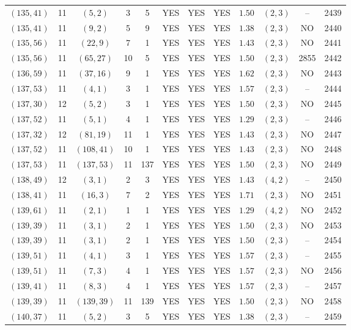 \begin{longtable}{|c|c|c|c|c|c|c|c|c|c|c|c|}
$(135,41)$ & 11 & $(5,2)$ & 3 & 5 & YES & YES & YES & $1.50$ & $(2,3)$ & -- & 2439\\
$(135,41)$ & 11 & $(9,2)$ & 5 & 9 & YES & YES & YES & $1.38$ & $(2,3)$ & NO & 2440\\
$(135,56)$ & 11 & $(22,9)$ & 7 & 1 & YES & YES & YES & $1.43$ & $(2,3)$ & NO & 2441\\
$(135,56)$ & 11 & $(65,27)$ & 10 & 5 & YES & YES & YES & $1.50$ & $(2,3)$ & 2855 & 2442\\
$(136,59)$ & 11 & $(37,16)$ & 9 & 1 & YES & YES & YES & $1.62$ & $(2,3)$ & NO & 2443\\
$(137,53)$ & 11 & $(4,1)$ & 3 & 1 & YES & YES & YES & $1.57$ & $(2,3)$ & -- & 2444\\
$(137,30)$ & 12 & $(5,2)$ & 3 & 1 & YES & YES & YES & $1.50$ & $(2,3)$ & NO & 2445\\
$(137,52)$ & 11 & $(5,1)$ & 4 & 1 & YES & YES & YES & $1.29$ & $(2,3)$ & -- & 2446\\
$(137,32)$ & 12 & $(81,19)$ & 11 & 1 & YES & YES & YES & $1.43$ & $(2,3)$ & NO & 2447\\
$(137,52)$ & 11 & $(108,41)$ & 10 & 1 & YES & YES & YES & $1.43$ & $(2,3)$ & NO & 2448\\
$(137,53)$ & 11 & $(137,53)$ & 11 & 137 & YES & YES & YES & $1.50$ & $(2,3)$ & NO & 2449\\
$(138,49)$ & 12 & $(3,1)$ & 2 & 3 & YES & YES & YES & $1.43$ & $(4,2)$ & -- & 2450\\
$(138,41)$ & 11 & $(16,3)$ & 7 & 2 & YES & YES & YES & $1.71$ & $(2,3)$ & NO & 2451\\
$(139,61)$ & 11 & $(2,1)$ & 1 & 1 & YES & YES & YES & $1.29$ & $(4,2)$ & NO & 2452\\
$(139,39)$ & 11 & $(3,1)$ & 2 & 1 & YES & YES & YES & $1.50$ & $(2,3)$ & NO & 2453\\
$(139,39)$ & 11 & $(3,1)$ & 2 & 1 & YES & YES & YES & $1.50$ & $(2,3)$ & -- & 2454\\
$(139,51)$ & 11 & $(4,1)$ & 3 & 1 & YES & YES & YES & $1.57$ & $(2,3)$ & -- & 2455\\
$(139,51)$ & 11 & $(7,3)$ & 4 & 1 & YES & YES & YES & $1.57$ & $(2,3)$ & NO & 2456\\
$(139,41)$ & 11 & $(8,3)$ & 4 & 1 & YES & YES & YES & $1.57$ & $(2,3)$ & -- & 2457\\
$(139,39)$ & 11 & $(139,39)$ & 11 & 139 & YES & YES & YES & $1.50$ & $(2,3)$ & NO & 2458\\
$(140,37)$ & 11 & $(5,2)$ & 3 & 5 & YES & YES & YES & $1.38$ & $(2,3)$ & -- & 2459\\

\end{longtable}
